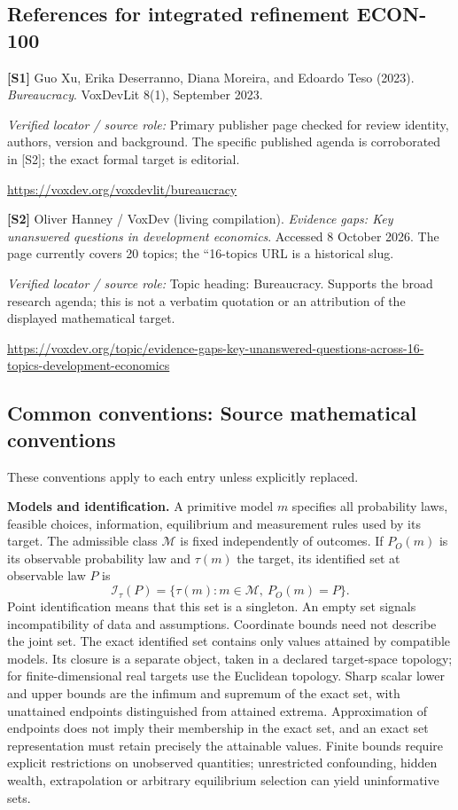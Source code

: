 \documentclass[11pt,a4paper]{article}
\begin{document}
\subsection*{References for integrated refinement ECON-100}
{\footnotesize\raggedright
\par\noindent\textbf{[S1]} Guo Xu, Erika Deserranno, Diana Moreira, and Edoardo Teso (2023). \emph{Bureaucracy}. VoxDevLit 8(1), September 2023.\par \textit{Verified locator / source role:} Primary publisher page checked for review identity, authors, version and background. The specific published agenda is corroborated in [S2]; the exact formal target is editorial.\par \url{https://voxdev.org/voxdevlit/bureaucracy}\par\smallskip
\par\noindent\textbf{[S2]} Oliver Hanney / VoxDev (living compilation). \emph{Evidence gaps: Key unanswered questions in development economics}. Accessed 8 October 2026. The page currently covers 20 topics; the ``16-topics URL is a historical slug.\par \textit{Verified locator / source role:} Topic heading: Bureaucracy. Supports the broad research agenda; this is not a verbatim quotation or an attribution of the displayed mathematical target.\par \url{https://voxdev.org/topic/evidence-gaps-key-unanswered-questions-across-16-topics-development-economics}\par\smallskip
}

\subsection*{Common conventions: Source mathematical conventions}

These conventions apply to each entry unless explicitly replaced.

\textbf{Models and identification.} A primitive model \(m\) specifies all probability laws, feasible choices, information, equilibrium and measurement rules used by its target. The admissible class \(\mathcal M\) is fixed independently of outcomes. If \(P_O(m)\) is its observable probability law and \(\tau(m)\) the target, its identified set at observable law \(P\) is
\[
 \mathcal I_\tau(P)=\{\tau(m):m\in\mathcal M,\ P_O(m)=P\}.
\]
Point identification means that this set is a singleton. An empty set signals incompatibility of data and assumptions. Coordinate bounds need not describe the joint set. The exact identified set contains only values attained by compatible models. Its closure is a separate object, taken in a declared target-space topology; for finite-dimensional real targets use the Euclidean topology. Sharp scalar lower and upper bounds are the infimum and supremum of the exact set, with unattained endpoints distinguished from attained extrema. Approximation of endpoints does not imply their membership in the exact set, and an exact set representation must retain precisely the attainable values. Finite bounds require explicit restrictions on unobserved quantities; unrestricted confounding, hidden wealth, extrapolation or arbitrary equilibrium selection can yield uninformative sets.
\end{document}

